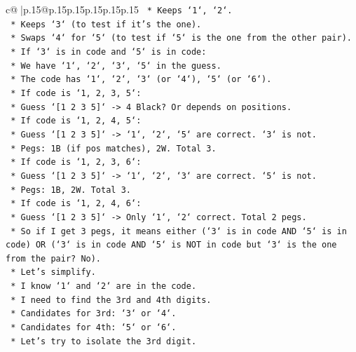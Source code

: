\documentclass{article}
\begin{document}
{\begin{supertabular}{c@{$\;$}|p{.15\linewidth}@{}p{.15\linewidth}p{.15\linewidth}p{.15\linewidth}p{.15\linewidth}p{.15\linewidth}}
{{{\texttt{            *   Keeps `1`, `2`.} \\
\texttt{            *   Keeps `3` (to test if it's the one).} \\
\texttt{            *   Swaps `4` for `5` (to test if `5` is the one from the other pair).} \\
\texttt{            *   If `3` is in code and `5` is in code:} \\
\texttt{                *   We have `1`, `2`, `3`, `5` in the guess.} \\
\texttt{                *   The code has `1`, `2`, `3` (or `4`), `5` (or `6`).} \\
\texttt{                *   If code is `1, 2, 3, 5`:} \\
\texttt{                    *   Guess `{[}1 2 3 5{]}` {-}> 4 Black? Or depends on positions.} \\
\texttt{                *   If code is `1, 2, 4, 5`:} \\
\texttt{                    *   Guess `{[}1 2 3 5{]}` {-}> `1`, `2`, `5` are correct. `3` is not.} \\
\texttt{                    *   Pegs: 1B (if pos matches), 2W. Total 3.} \\
\texttt{                *   If code is `1, 2, 3, 6`:} \\
\texttt{                    *   Guess `{[}1 2 3 5{]}` {-}> `1`, `2`, `3` are correct. `5` is not.} \\
\texttt{                    *   Pegs: 1B, 2W. Total 3.} \\
\texttt{                *   If code is `1, 2, 4, 6`:} \\
\texttt{                    *   Guess `{[}1 2 3 5{]}` {-}> Only `1`, `2` correct. Total 2 pegs.} \\
\texttt{            *   So if I get 3 pegs, it means either (`3` is in code AND `5` is in code) OR (`3` is in code AND `5` is NOT in code but `3` is the one from the pair? No).} \\
\texttt{            *   Let's simplify.} \\
\texttt{            *   I know `1` and `2` are in the code.} \\
\texttt{            *   I need to find the 3rd and 4th digits.} \\
\texttt{            *   Candidates for 3rd: `3` or `4`.} \\
\texttt{            *   Candidates for 4th: `5` or `6`.} \\
\texttt{            *   Let's try to isolate the 3rd digit.} \\
}}}
\end{supertabular}}
\end{document}
